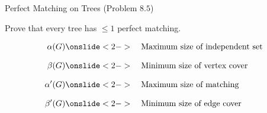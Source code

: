\begin{frame}{}
  \begin{exampleblock}{Perfect Matching on Trees (Problem $8.5$)}
    \begin{center}
      Prove that every tree has $\le 1$ perfect matching.
    \end{center}
  \end{exampleblock}
\end{frame}

\begin{frame}{}

  \begin{align*}
    \alpha(G) 	& \onslide<2->{\text{\quad Maximum size of independent set}} \\[8pt]
    \beta(G) 	& \onslide<2->{\text{\quad Minimum size of vertex cover}} \\[8pt]
    \alpha'(G)  & \onslide<2->{\text{\quad Maximum size of matching}} \\[8pt]
    \beta'(G) 	& \onslide<2->{\text{\quad Minimum size of edge cover}}
  \end{align*}

\end{frame}


